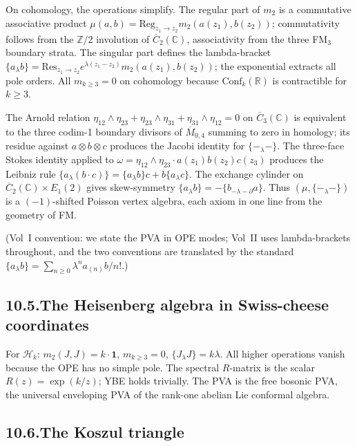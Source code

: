 \documentclass[11pt,reqno]{amsart}
\theoremstyle{definition}
\theoremstyle{remark}
\providecommand{\cH}{\mathcal{H}}
\providecommand{\Res}{\mathrm{Res}}
\providecommand{\FM}{\overline{C}}
\providecommand{\bC}{\mathbb{C}}
\providecommand{\bZ}{\mathbb{Z}}
\providecommand{\bR}{\mathbb{R}}
\providecommand{\Conf}{\mathrm{Conf}}
\providecommand{\Reg}{\mathrm{Reg}}
\numberwithin{equation}{section}
\begin{document}
On cohomology, the operations simplify. The regular part of
$m_2$ is a commutative associative product
$\mu(a,b) = \Reg_{z_1 \to z_2} m_2(a(z_1), b(z_2))$;
commutativity follows from the $\bZ/2$ involution of
$\FM_2(\bC)$, associativity from the three FM$_3$ boundary
strata. The singular part defines the lambda-bracket
$\{a_\lambda b\} = \Res_{z_1 \to z_2} e^{\lambda(z_1 - z_2)}
m_2(a(z_1), b(z_2))$; the exponential extracts all pole orders.
All $m_{k \ge 3} = 0$ on cohomology because $\Conf_k(\bR)$ is
contractible for $k \ge 3$.

The Arnold relation
$\eta_{12}\wedge\eta_{23} + \eta_{23}\wedge\eta_{31}
+ \eta_{31}\wedge\eta_{12} = 0$ on $\FM_3(\bC)$ is equivalent
to the three codim-1 boundary divisors of $\overline M_{0,4}$
summing to zero in homology; its residue against
$a\otimes b\otimes c$ produces the Jacobi identity for
$\{-_\lambda -\}$. The three-face Stokes identity applied to
$\omega = \eta_{12}\wedge\eta_{23}\cdot a(z_1)b(z_2)c(z_3)$
produces the Leibniz rule $\{a_\lambda(b\cdot c)\} =
\{a_\lambda b\}c + b\{a_\lambda c\}$. The exchange cylinder
on $\FM_2(\bC)\times E_1(2)$ gives skew-symmetry
$\{a_\lambda b\} = -\{b_{-\lambda - \partial} a\}$. Thus
$(\mu, \{-_\lambda -\})$ is a $(-1)$-shifted Poisson vertex
algebra, each axiom in one line from the geometry of FM.

(Vol~I convention: we state the PVA in OPE modes; Vol~II uses
lambda-brackets throughout, and the two conventions are
translated by the standard
$\{a_\lambda b\} = \sum_{n \ge 0}\lambda^n a_{(n)}b/n!$.)

\subsection*{10.5.\enspace The Heisenberg algebra in Swiss-cheese coordinates}

For $\cH_k$: $m_2(J, J) = k \cdot \mathbf 1$,
$m_{k \ge 3} = 0$, $\{J_\lambda J\} = k\lambda$. All higher
operations vanish because the OPE has no simple pole. The
spectral $R$-matrix is the scalar $R(z) = \exp(k/z)$; YBE
holds trivially. The PVA is the free bosonic PVA, the
universal enveloping PVA of the rank-one abelian Lie conformal
algebra.

\subsection*{10.6.\enspace The Koszul triangle}
\end{document}
